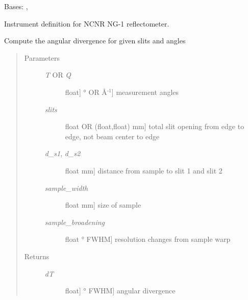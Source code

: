 \documentclass[letterpaper,10pt,english]{sphinxmanual}
\begin{document}
\begin{fulllineitems}
\label{api/ncnrdata:refl1d.ncnrdata.NG1}
Bases: {\hyperref[api/ncnrdata:refl1d.ncnrdata.NCNRData]{}}, {\hyperref[api/instrument:refl1d.instrument.Monochromatic]{}}

Instrument definition for NCNR NG-1 reflectometer.

\begin{fulllineitems}
\label{api/ncnrdata:refl1d.ncnrdata.NG1.calc_dT}
Compute the angular divergence for given slits and angles
\begin{quote}\begin{description}
\item[{Parameters }] \leavevmode\begin{description}
\item[{\emph{T} OR \emph{Q}}] \leavevmode{[}{[}float{]} \textbar{} ° OR Å$^{\text{-1}}${]}
measurement angles

\item[{\emph{slits}}] \leavevmode{[}float OR (float,float) \textbar{} mm{]}
total slit opening from edge to edge, not beam center to edge

\item[{\emph{d\_s1}, \emph{d\_s2}}] \leavevmode{[}float \textbar{} mm{]}
distance from sample to slit 1 and slit 2

\item[{\emph{sample\_width}}] \leavevmode{[}float \textbar{} mm{]}
size of sample

\item[{\emph{sample\_broadening}}] \leavevmode{[}float \textbar{} ° FWHM{]}
resolution changes from sample warp

\end{description}

\item[{Returns }] \leavevmode\begin{description}
\item[{\emph{dT}}] \leavevmode{[}{[}float{]} \textbar{} ° FWHM{]}
angular divergence

\end{description}

\end{description}\end{quote}


\end{fulllineitems}
\end{fulllineitems}
\end{document}
